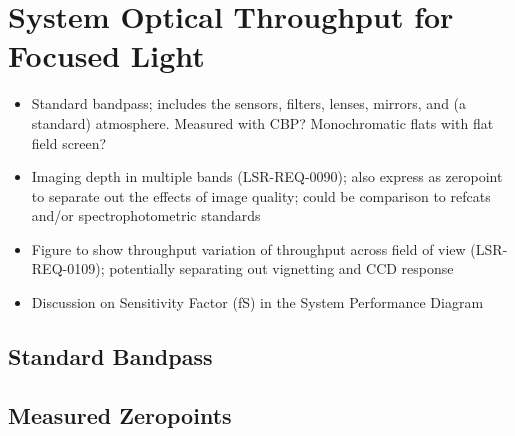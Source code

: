 \section{System Optical Throughput for Focused Light}
\label{sec:throughput}

\begin{itemize}
    \item Standard bandpass; includes the sensors, filters, lenses, mirrors, and (a standard) atmosphere. Measured with CBP? Monochromatic flats with flat field screen?
    \item Imaging depth in multiple bands (LSR-REQ-0090); also express as zeropoint to separate out the effects of image quality; could be comparison to refcats and/or spectrophotometric standards
    \item Figure to show throughput variation of throughput across field of view (LSR-REQ-0109); potentially separating out vignetting and CCD response
    \item Discussion on Sensitivity Factor (fS) in the System Performance Diagram
\end{itemize}

\subsection{Standard Bandpass}

\subsection{Measured Zeropoints}

